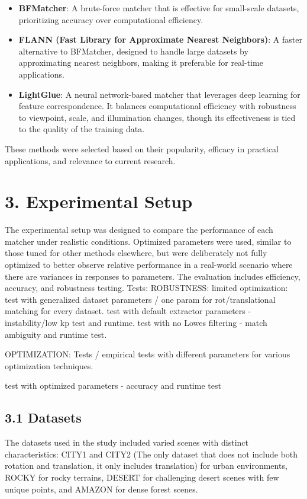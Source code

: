 \begin{itemize}
    \item \textbf{BFMatcher}: A brute-force matcher that is effective for small-scale datasets, prioritizing accuracy over computational efficiency.
    \item \textbf{FLANN (Fast Library for Approximate Nearest Neighbors)}: A faster alternative to BFMatcher, designed to handle large datasets by approximating nearest neighbors, making it preferable for real-time applications.
    \item \textbf{LightGlue}: A neural network-based matcher that leverages deep learning for feature correspondence. It balances computational efficiency with robustness to viewpoint, scale, and illumination changes, though its effectiveness is tied to the quality of the training data.
\end{itemize}

These methods were selected based on their popularity, efficacy in practical applications, and relevance to current research. 

\section*{3. Experimental Setup}

The experimental setup was designed to compare the performance of each matcher under realistic conditions. Optimized parameters were used, similar to those tuned for other methods elsewhere, but were deliberately not fully optimized to better observe relative performance in a real-world scenario where there are variances in responses to parameters. The evaluation includes efficiency, accuracy, and robustness testing. 
Tests:
ROBUSTNESS:
limited optimization:
test with generalized dataset parameters / one param for rot/translational matching for every dataset. 
test with default extractor parameters - instability/low kp test and runtime. 
test with no Lowes filtering - match ambiguity and runtime test. 

OPTIMIZATION:
Tests / empirical tests with different parameters for various optimization techniques. 

test with optimized parameters - accuracy and runtime test

\subsection*{3.1 Datasets}

The datasets used in the study included varied scenes with distinct characteristics: CITY1 and CITY2 (The only dataset that does not include both rotation and translation, it only includes translation) for urban environments, ROCKY for rocky terrains, DESERT for challenging desert scenes with few unique points, and AMAZON for dense forest scenes.

